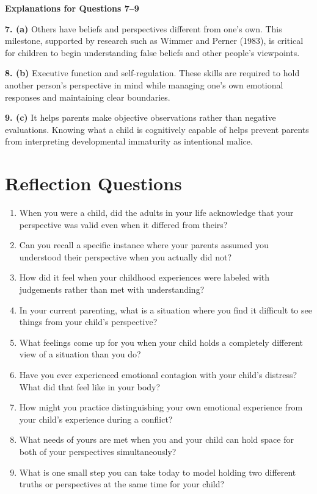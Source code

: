 \begin{practiceexercise}
\textbf{Explanations for Questions 7--9}

\textbf{7. (a)} Others have beliefs and perspectives different from one's own. This milestone, supported by research such as Wimmer and Perner (1983), is critical for children to begin understanding false beliefs and other people's viewpoints.

\textbf{8. (b)} Executive function and self-regulation. These skills are required to hold another person's perspective in mind while managing one's own emotional responses and maintaining clear boundaries.

\textbf{9. (c)} It helps parents make objective observations rather than negative evaluations. Knowing what a child is cognitively capable of helps prevent parents from interpreting developmental immaturity as intentional malice.
\vspace{\fill}

\end{practiceexercise}

\newpage
\section{Reflection Questions}

\begin{reflection}
\small
\begin{enumerate}[itemsep=0pt, parsep=0pt, topsep=0pt]
  \item When you were a child, did the adults in your life acknowledge that your perspective was valid even when it differed from theirs?
  \item Can you recall a specific instance where your parents assumed you understood their perspective when you actually did not?
  \item How did it feel when your childhood experiences were labeled with judgements rather than met with understanding?
  \item In your current parenting, what is a situation where you find it difficult to see things from your child's perspective?
  \item What feelings come up for you when your child holds a completely different view of a situation than you do?
  \item Have you ever experienced emotional contagion with your child's distress? What did that feel like in your body?
  \item How might you practice distinguishing your own emotional experience from your child's experience during a conflict?
  \item What needs of yours are met when you and your child can hold space for both of your perspectives simultaneously?
  \item What is one small step you can take today to model holding two different truths or perspectives at the same time for your child?
\end{enumerate}
\end{reflection}
